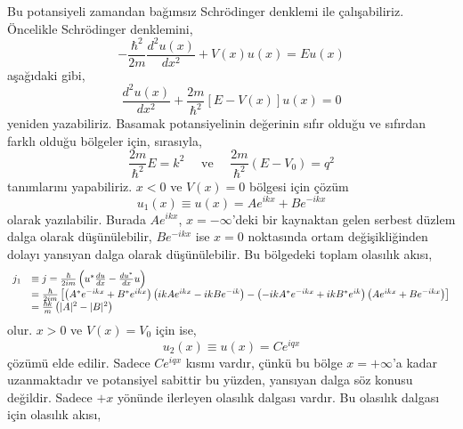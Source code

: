 \documentclass[a4paper,12pt, twoside]{article}
\begin{document}
Bu potansiyeli zamandan bağımsız Schrödinger denklemi ile çalışabiliriz. Öncelikle Schrödinger denklemini,
\begin{equation}
- \frac { \hbar ^ { 2 } } { 2 m } \frac { d ^ { 2 } u ( x ) } { d x ^ { 2 } } + V ( x ) u ( x ) = E u ( x )
\end{equation}
aşağıdaki gibi,
\begin{equation}
\frac { d ^ { 2 } u ( x ) } { d x ^ { 2 } } + \frac { 2 m } { \hbar ^ { 2 } } [ E - V ( x ) ] u ( x ) = 0
\end{equation}
yeniden yazabiliriz. Basamak potansiyelinin değerinin sıfır olduğu ve sıfırdan farklı olduğu bölgeler için, sırasıyla,
\begin{equation}
\frac { 2 m} { \hbar ^ { 2 } } E = k ^ { 2 } \quad \text{ ve } \quad \frac { 2 m} { \hbar ^ { 2 } }  \left( E - V _ { 0 } \right) = q ^ { 2 }
\end{equation}
tanımlarını yapabiliriz. $x<0$ ve $V(x)=0$ bölgesi için çözüm
\begin{equation}
u_1 ( x ) \equiv u ( x ) = A e ^ { i k x } + B e ^ { - i k x }
\end{equation}
olarak yazılabilir. Burada $A e ^ { i k x }$, $x=-\infty$'deki bir kaynaktan gelen serbest düzlem dalga olarak düşünülebilir, $B e ^ { -i k x }$ ise $x=0$ noktasında ortam değişikliğinden dolayı yansıyan dalga olarak düşünülebilir. Bu bölgedeki toplam olasılık akısı,
\begin{equation}
\begin{array} { r l } 
{ j_1 } &\equiv  j  = \frac { \hbar } { 2 i m } \left( u ^ { * } \frac { d u } { d x } - \frac { d u ^ { * } } { d x } u \right) \\
& = \frac { \hbar } { 2 i m } \left[ \left(A^{*} e ^ { - i k x } + B ^ { * } e ^ { i k x } \right) \left(i k A e ^ { i k x } - i k B e ^ { - i k } \right) - \left( -i k A^{*} e ^ { -i k x } + i k B^* e ^ {  i k } \right) \left( A e ^ { i k x } + B  e ^ { -i k x } \right)  \right]  \\ 
{ } & { = \frac { \hbar k } { m } \left( | A | ^ { 2 }  - | B | ^ { 2 } \right) } \end{array}
\end{equation}
olur. $x>0$ ve $V(x)=V_0$ için ise,
\begin{equation}
u_2 ( x ) \equiv u ( x ) =  C e ^ { i q x }
\end{equation}
çözümü elde edilir. Sadece $C e ^ { i q x }$ kısmı vardır, çünkü bu bölge $x=+\infty$'a kadar uzanmaktadır ve potansiyel sabittir bu yüzden, yansıyan dalga söz konusu değildir. Sadece $+x$ yönünde ilerleyen olasılık dalgası vardır. Bu olasılık dalgası için olasılık akısı,
\end{document}
